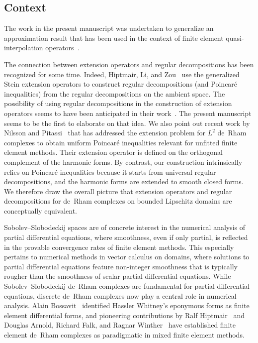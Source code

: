 \documentclass[10pt,a4paper]{amsart}
\theoremstyle{definition}
\theoremstyle{remark}
\numberwithin{equation}{section}
\begin{document}
\subsection{Context}

The work in the present manuscript was undertaken to generalize an approximation result that has been used in the context of finite element quasi-interpolation operators~\cite{licht2023averaging}. 

The connection between extension operators and regular decompositions has been recognized for some time.
Indeed, Hiptmair, Li, and Zou~\cite{hiptmair2012universal} use the generalized Stein extension operators to construct regular decompositions (and Poincar\'e inequalities) from the regular decompositions on the ambient space. 
The possibility of using regular decompositions in the construction of extension operators seems to have been anticipated in their work~\cite[Remark~3.2]{hiptmair2012universal}. The present manuscript seems to be the first to elaborate on that idea.
We also point out recent work by Nilsson and Pitassi~\cite{nilsson2026uniformly} that has addressed the extension problem for $L^{2}$ de~Rham complexes to obtain uniform Poincar\'e inequalities relevant for unfitted finite element methods. Their extension operator is defined on the orthogonal complement of the harmonic forms. By contrast, our construction intrinsically relies on Poincar\'e inequalities because it starts from universal regular decompositions, and the harmonic forms are extended to smooth closed forms. 
We therefore draw the overall picture that extension operators and regular decompositions for de~Rham complexes on bounded Lipschitz domains are conceptually equivalent. 



Sobolev--Slobodeckij spaces are of concrete interest in the numerical analysis of partial differential equations, where smoothness, even if only partial, is reflected in the provable convergence rates of finite element methods. This especially pertains to numerical methods in vector calculus on domains, where solutions to partial differential equations feature non-integer smoothness that is typically rougher than the smoothness of scalar partial differential equations.
While Sobolev--Slobodeckij de~Rham complexes are fundamental for partial differential equations, discrete de~Rham complexes now play a central role in numerical analysis. 
Alain Bossavit~\cite{bossavit1992new,rapetti2009whitney} identified Hassler Whitney's eponymous forms as finite element differential forms, and pioneering contributions by Ralf Hiptmair~\cite{hiptmair2002finite} and Douglas Arnold, Richard Falk, and Ragnar Winther~\cite{AFW1} have established finite element de~Rham complexes as paradigmatic in mixed finite element methods. 
\end{document}
